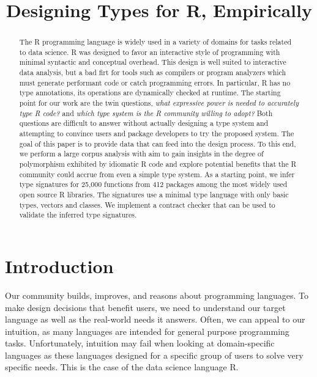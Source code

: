 \documentclass[acmsmall,review,anonymous]{acmart}\settopmatter{printfolios=true,printccs=false,printacmref=false}
\begin{document}
\title{Designing Types for R, Empirically}

\newcommand{\NUMFUNCTIONS}{25,000\xspace}  %
\newcommand{\NUMPACKAGES}{412\xspace}  %
\newcommand{\PACKAGES}{412\xspace}  %
\newcommand{\genthat}{genthat\xspace}  %
\newcommand{\YEARS}{20\xspace} %


\begin{abstract}
The R programming language is widely used in a variety of domains for tasks
related to data science. R was designed to favor an interactive style of
programming with minimal syntactic and conceptual overhead. This design is
well suited to interactive data analysis, but a bad firt for tools such as
compilers or program analyzers which must generate performant code or catch
programming errors.  In particular, R has no type annotations, its
operations are dynamically checked at runtime. The starting point for our
work are the twin questions, \emph{what expressive power is needed to
  accurately type R code?} and \emph{which type system is the R community
  willing to adopt?} Both questions are difficult to answer without actually
designing a type system and attempting to convince users and package
developers to try the proposed system.  The goal of this paper is to provide
data that can feed into the design process. To this end, we perform a large
corpus analysis with aim to gain insights in the degree of polymorphism
exhibited by idiomatic R code and explore potential benefits that the R
community could accrue from even a simple type system.  As a starting point,
we infer type signatures for \NUMFUNCTIONS functions from \NUMPACKAGES
packages among the most widely used open source R libraries. The signatures
use a minimal type language with only basic types, vectors and classes.  We
implement a contract checker that can be used to validate the inferred type
signatures.
\end{abstract} \maketitle

\section{Introduction}

Our community builds, improves, and reasons about programming languages.  To
make design decisions that benefit users, we need to understand our target
language as well as the real-world needs it answers. Often, we can appeal to
our intuition, as many languages are intended for general purpose
programming tasks. Unfortunately, intuition may fail when looking at
domain-specific languages as these languages designed for a specific group
of users to solve very specific needs. This is the case of the data science
language R.
\end{document}
